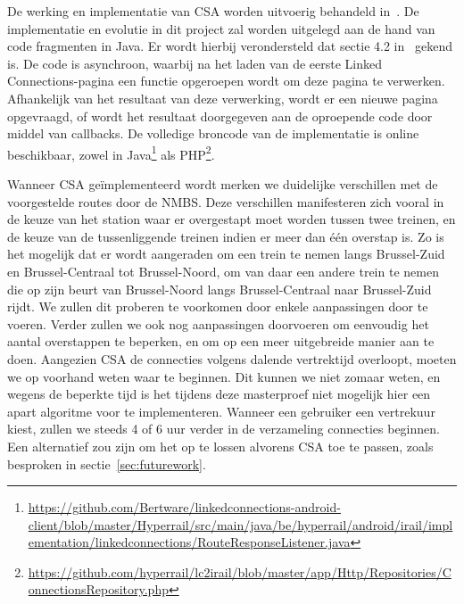 De werking en implementatie van CSA worden uitvoerig behandeld in~\citep{strasser17}. %
De implementatie en evolutie in dit project zal worden uitgelegd aan de hand van code fragmenten in Java. Er wordt hierbij verondersteld dat sectie 4.2 in~\cite{strasser17} gekend is. De code is asynchroon, waarbij na het laden van de eerste Linked Connections-pagina een  functie opgeroepen wordt om deze pagina te verwerken. Afhankelijk van het resultaat van deze verwerking, wordt er een nieuwe pagina opgevraagd, of wordt het resultaat doorgegeven aan de oproepende code door middel van callbacks. De volledige broncode van de implementatie is online beschikbaar, zowel in  Java\footnote{\url{https://github.com/Bertware/linkedconnections-android-client/blob/master/Hyperrail/src/main/java/be/hyperrail/android/irail/implementation/linkedconnections/RouteResponseListener.java}} als PHP\footnote{\url{https://github.com/hyperrail/lc2irail/blob/master/app/Http/Repositories/ConnectionsRepository.php}}.

Wanneer CSA geïmplementeerd wordt merken we duidelijke verschillen met de voorgestelde routes door de NMBS. Deze verschillen manifesteren zich vooral in de keuze van het station waar er overgestapt moet worden tussen twee treinen, en de keuze van de tussenliggende treinen indien er meer dan één overstap is. Zo is het mogelijk dat er wordt aangeraden om een trein te nemen langs Brussel-Zuid en Brussel-Centraal tot Brussel-Noord, om van daar een andere trein te nemen die op zijn beurt van Brussel-Noord langs Brussel-Centraal naar Brussel-Zuid rijdt. We zullen dit proberen te voorkomen door enkele aanpassingen door te voeren.
Verder zullen we ook nog aanpassingen doorvoeren om eenvoudig het aantal overstappen te beperken, en om op een meer uitgebreide manier aan  te doen. Aangezien CSA de connecties volgens dalende vertrektijd overloopt, moeten we op voorhand weten waar te beginnen. Dit kunnen we niet zomaar weten, en wegens de beperkte tijd is het tijdens deze masterproef niet mogelijk hier een apart algoritme voor te implementeren. Wanneer een gebruiker een vertrekuur kiest, zullen we steeds 4 of 6 uur verder in de verzameling connecties beginnen. Een alternatief zou zijn om het  op te lossen alvorens CSA toe te passen, zoals besproken in sectie~\ref{sec:futurework}.

